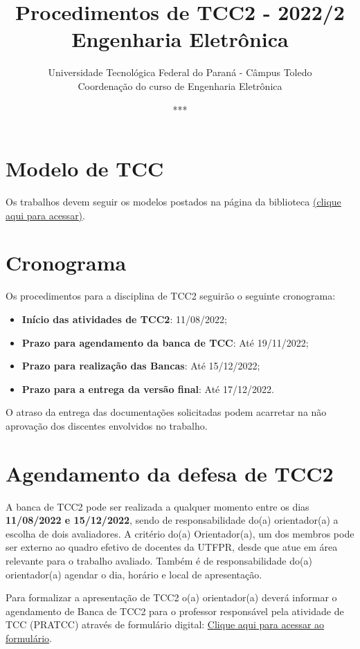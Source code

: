 \documentclass[a4paper, 12pt]{article}
\title{Procedimentos de TCC2 - 2022/2\\\textbf{Engenharia Eletrônica}}
\date{***}
\author{Universidade Tecnológica Federal do Paraná - Câmpus Toledo\\Coordenação do curso de Engenharia Eletrônica}
\newcommand{\startdate}{11/08/2022}		%
\newcommand{\agendadate}{19/11/2022}	%
\newcommand{\bancadate}{15/12/2022}		%
\newcommand{\finaldate}{17/12/2022}		%
\begin{document}
    \maketitle
    
    \section{Modelo de TCC}
    Os trabalhos devem seguir os modelos postados na página da biblioteca \href{http://portal.utfpr.edu.br/biblioteca/trabalhos-academicos}{(clique aqui para acessar)}.
    
    \section{Cronograma}
    \label{sec:CRO}
    
    Os procedimentos para a disciplina de TCC2 seguirão o seguinte cronograma:
    \begin{itemize}
    	\item \textbf{Início das atividades de TCC2}: \startdate;
    	\item \textbf{Prazo para agendamento da banca de TCC}: Até \agendadate;
    	\item \textbf{Prazo para realização das Bancas}: Até \bancadate;
    	\item \textbf{Prazo para a entrega da versão final}: Até \finaldate.
    \end{itemize}

	O atraso da entrega das documentações solicitadas podem acarretar na não aprovação dos discentes envolvidos no trabalho.    
        
   \section{Agendamento da defesa de TCC2}

    A banca de TCC2 pode ser realizada a qualquer momento entre os dias \textbf{\startdate{} e \bancadate{}}, sendo de responsabilidade do(a) orientador(a) a escolha de dois avaliadores. A critério do(a) Orientador(a), um dos membros pode ser externo ao quadro efetivo de docentes da UTFPR, desde que atue em área relevante para o trabalho avaliado. Também é de responsabilidade do(a) orientador(a) agendar o dia, horário e local de apresentação. 
    
    Para formalizar a apresentação de TCC2 o(a) orientador(a) deverá informar o agendamento de Banca de TCC2 para o professor responsável pela atividade de TCC (PRATCC) através de formulário digital: \href{https://forms.gle/QVNraTXAZ27V1xSK8}{Clique aqui para acessar ao formulário}.
    
\end{document}
